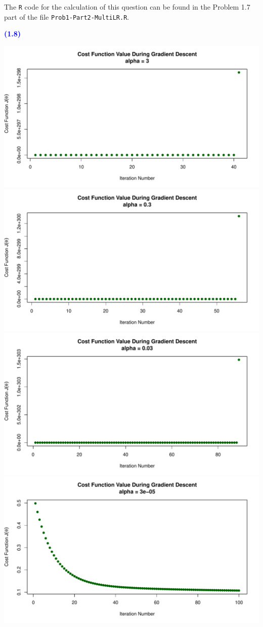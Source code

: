 \documentclass[a4paper,12pt]{article}
\newcommand{\code}[1]{\texttt{#1}}
\newcommand{\qnum}[1]{\noindent\textcolor{blue}{\textbf{(#1)}}}
\begin{document}
The \code{R} code for the calculation of this question can be found in the Problem 1.7 part of the file \code{Prob1-Part2-MultiLR.R}.
\bigskip






\qnum{1.8}
\begin{center}
    \includegraphics[width=0.9\linewidth]{Images/Prob1-8-alpha1.pdf}
    \includegraphics[width=0.9\linewidth]{Images/Prob1-8-alpha2.pdf}
    \includegraphics[width=0.9\linewidth]{Images/Prob1-8-alpha3.pdf}
    \includegraphics[width=0.9\linewidth]{Images/Prob1-8-alpha4-itr100.pdf}
\end{center}
\end{document}
